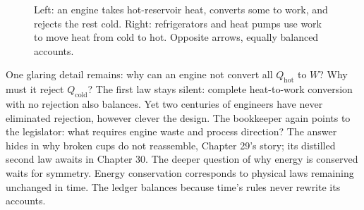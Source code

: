 \begin{figure}[htbp]
\centering
{}
\caption{Left: an engine takes hot-reservoir heat, converts some to work, and rejects the rest cold. Right: refrigerators and heat pumps use work to move heat from cold to hot. Opposite arrows, equally balanced accounts.}
\end{figure}

\begin{mainline}
One glaring detail remains: why can an engine not convert all \(Q_{\text{hot}}\) to \(W\)? Why must it reject \(Q_{\text{cold}}\)? The first law stays silent: complete heat-to-work conversion with no rejection also balances. Yet two centuries of engineers have never eliminated rejection, however clever the design. The bookkeeper again points to the legislator: what requires engine waste and process direction? The answer hides in why broken cups do not reassemble, Chapter 29's story; its distilled second law awaits in Chapter 30. The deeper question of why energy is conserved waits for symmetry. Energy conservation corresponds to physical laws remaining unchanged in time. The ledger balances because time's rules never rewrite its accounts.
\end{mainline}

